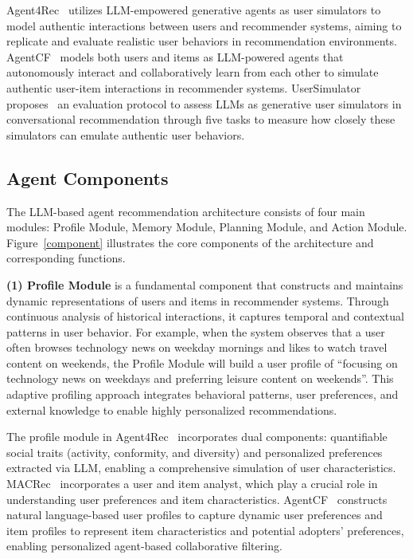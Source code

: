 Agent4Rec~\cite{zhang2024generative} utilizes LLM-empowered generative agents as user simulators to model authentic interactions between users and recommender systems, aiming to replicate and evaluate realistic user behaviors in recommendation environments.
AgentCF~\cite{zhang2024agentcf} models both users and items as LLM-powered agents that autonomously interact and collaboratively learn from each other to simulate authentic user-item interactions in recommender systems.
UserSimulator proposes~\cite{yoon2024evaluating} an evaluation protocol to assess LLMs as generative user simulators in conversational recommendation through five tasks to measure how closely these simulators can emulate authentic user behaviors.


\subsection{Agent Components}

The LLM-based agent recommendation architecture consists of four main modules: Profile Module, Memory Module, Planning Module, and Action Module.
Figure~\ref{component} illustrates the core components of the architecture and corresponding functions.


\textbf{(1) Profile Module} is a fundamental component that constructs and maintains dynamic representations of users and items in recommender systems. 
Through continuous analysis of historical interactions, it captures temporal and contextual patterns in user behavior. 
For example, when the system observes that a user often browses technology news on weekday mornings and likes to watch travel content on weekends, the Profile Module will build a user profile of ``focusing on technology news on weekdays and preferring leisure content on weekends''. 
This adaptive profiling approach integrates behavioral patterns, user preferences, and external knowledge to enable highly personalized recommendations.

The profile module in Agent4Rec~\cite{zhang2024generative} incorporates dual components: quantifiable social traits (activity, conformity, and diversity) and personalized preferences extracted via LLM, enabling a comprehensive simulation of user characteristics.
MACRec~\cite{wang2024macrec} incorporates a user and item analyst, which play a crucial role in understanding user preferences and item characteristics.
AgentCF~\cite{zhang2024agentcf} constructs natural language-based user profiles to capture dynamic user preferences and item profiles to represent item characteristics and potential adopters' preferences, enabling personalized agent-based collaborative filtering.


